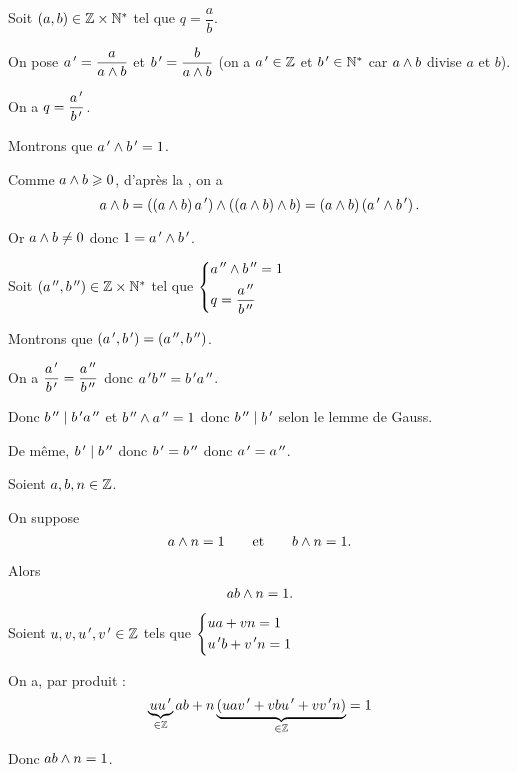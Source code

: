 \begin{dem}
Soit \(\left(a,b\right)\in\mathbb{Z}\times\mathbb{N}^*\) tel que \(q=\dfrac{a}{b}\).

\existence

On pose \(a^{\,\prime}=\dfrac{a}{a\land b}\) et \(b^{\,\prime}=\dfrac{b}{a\land b}\) (on a \(a^{\,\prime}\in\mathbb{Z}\) et \(b^{\,\prime}\in\mathbb{N}^*\) car \(a\land b\) divise \(a\) et \(b\)).

On a \(q=\dfrac{a^{\,\prime}}{b^{\,\prime}}\).

Montrons que \(a^{\,\prime}\land b^{\,\prime}=1\).

Comme \(a\land b\geqslant0\), d'après la , on a \[a\land b=\left(\left(a\land b\right)a^{\,\prime}\right)\land\left(\left(a\land b\right)\land b\right)=\left(a\land b\right)\left(a^{\,\prime}\land b^{\,\prime}\right).\]

Or \(a\land b\not=0\) donc \(1=a^{\,\prime}\land b^{\,\prime}\).

\unicite

Soit \(\left(a^{\,\prime\prime},b^{\,\prime\prime}\right)\in\mathbb{Z}\times\mathbb{N}^*\) tel que \(\begin{dcases}a^{\,\prime\prime}\land b^{\,\prime\prime}=1 \\ q=\dfrac{a^{\,\prime\prime}}{b^{\,\prime\prime}}\end{dcases}\)

Montrons que \(\left(a^{\,\prime},b^{\,\prime}\right)=\left(a^{\,\prime\prime},b^{\,\prime\prime}\right)\).

On a \(\dfrac{a^{\,\prime}}{b^{\,\prime}}=\dfrac{a^{\,\prime\prime}}{b^{\,\prime\prime}}\) donc \(a^{\,\prime} b^{\,\prime\prime}=b^{\,\prime} a^{\,\prime\prime}\).

Donc \(b^{\,\prime\prime}\mid b^{\,\prime} a^{\,\prime\prime}\) et \(b^{\,\prime\prime}\land a^{\,\prime\prime}=1\) donc \(b^{\,\prime\prime}\mid b^{\,\prime}\) selon le lemme de Gauss.

De même, \(b^{\,\prime}\mid b^{\,\prime\prime}\) donc \(b^{\,\prime}=b^{\,\prime\prime}\) donc \(a^{\,\prime}=a^{\,\prime\prime}\).
\end{dem}

\begin{prop}
Soient \(a,b,n\in\mathbb{Z}\).

On suppose \[a\land n=1\qquad\text{et}\qquad b\land n=1.\]

Alors \[ab\land n=1.\]
\end{prop}

\begin{dem}
Soient \(u,v,u^{\,\prime},v^{\,\prime}\in\mathbb{Z}\) tels que \(\begin{dcases}ua+vn=1 \\ u^{\,\prime} b+v^{\,\prime} n=1\end{dcases}\)

On a, par produit : \[\underbrace{uu^{\,\prime}}_{\in\mathbb{Z}}ab+n\underbrace{\left(uav^{\,\prime}+vbu^{\,\prime}+vv^{\,\prime} n\right)}_{\in\mathbb{Z}}=1\]

Donc \(ab\land n=1\).
\end{dem}

